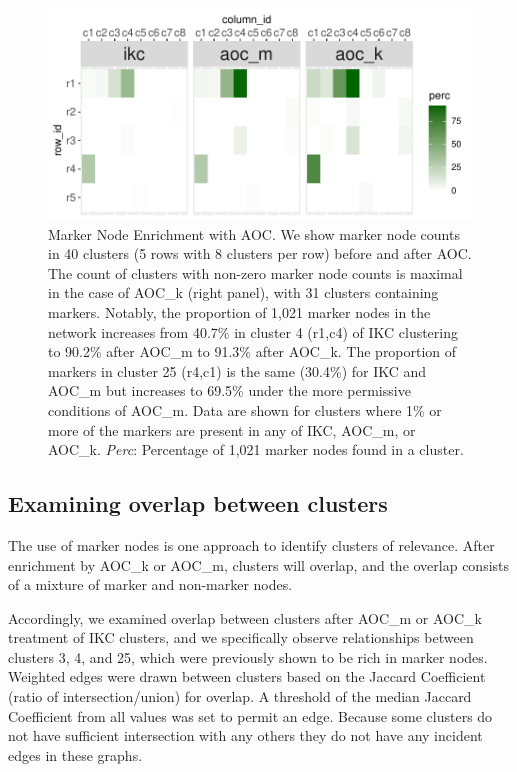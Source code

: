 \documentclass[12pt, oneside]{article}   	%
\begin{document}
 \begin{figure}[H]
\centering
\includegraphics[width=0.7\linewidth]{bl_marker_comps_wide.pdf} 
\captionsetup{width=0.9\textwidth}
\caption{Marker Node Enrichment with AOC. We show marker node counts in 40 clusters (5 rows with 8 clusters per row) before and after AOC.  The count of clusters with non-zero marker node counts is maximal in the case of AOC\_k (right panel), with 31 clusters containing markers. Notably, the proportion of 1,021 marker nodes in the network increases from 40.7\% in cluster 4 (r1,c4) of IKC clustering to 90.2\% after AOC\_m to 91.3\% after AOC\_k. The proportion of markers in cluster 25 (r4,c1) is the same (30.4\%) for IKC and AOC\_m but increases to  69.5\% under the more permissive conditions of AOC\_m. Data are shown for clusters where 1\% or more of the markers are present in any of IKC, AOC\_m, or AOC\_k. \emph{Perc}: Percentage of 1,021 marker nodes found in a cluster.}
\label{fig:marker-node-concentration}
\end{figure}
	
\clearpage
	
\subsection{Examining overlap between clusters}

The use of marker nodes is one approach to identify clusters of relevance. After enrichment by AOC\_k or AOC\_m, clusters will overlap, and the overlap consists of 
a mixture of marker and non-marker nodes.   

Accordingly, we examined overlap between clusters after AOC\_m or AOC\_k treatment of IKC clusters, and we specifically observe relationships between clusters 3, 4, and 25, which were previously shown to be rich in marker nodes. Weighted edges were drawn between clusters based on the Jaccard Coefficient (ratio of intersection/union) for overlap. A threshold of the median Jaccard Coefficient from all values was set to permit an edge. Because some clusters do not have sufficient intersection with any others  they do not have any incident edges in these graphs.
\end{document}

